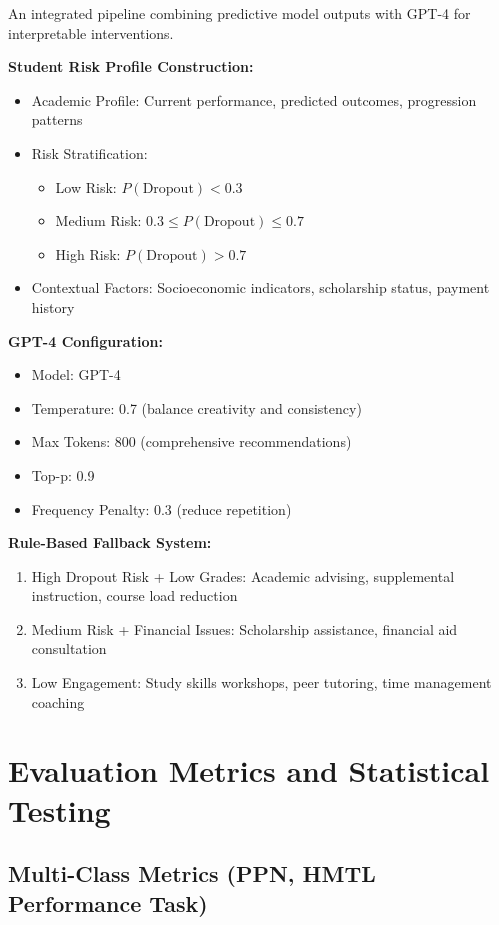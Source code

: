 An integrated pipeline combining predictive model outputs with GPT-4 for interpretable interventions.

\textbf{Student Risk Profile Construction:}
\begin{itemize}
\item Academic Profile: Current performance, predicted outcomes, progression patterns
\item Risk Stratification:
\begin{itemize}
\item Low Risk: $P(\text{Dropout}) < 0.3$
\item Medium Risk: $0.3 \leq P(\text{Dropout}) \leq 0.7$
\item High Risk: $P(\text{Dropout}) > 0.7$
\end{itemize}
\item Contextual Factors: Socioeconomic indicators, scholarship status, payment history
\end{itemize}

\textbf{GPT-4 Configuration:}
\begin{itemize}
\item Model: GPT-4
\item Temperature: 0.7 (balance creativity and consistency)
\item Max Tokens: 800 (comprehensive recommendations)
\item Top-p: 0.9
\item Frequency Penalty: 0.3 (reduce repetition)
\end{itemize}

\textbf{Rule-Based Fallback System:}
\begin{enumerate}
\item High Dropout Risk + Low Grades: Academic advising, supplemental instruction, course load reduction
\item Medium Risk + Financial Issues: Scholarship assistance, financial aid consultation
\item Low Engagement: Study skills workshops, peer tutoring, time management coaching
\end{enumerate}

\section{Evaluation Metrics and Statistical Testing}

\subsection{Multi-Class Metrics (PPN, HMTL Performance Task)}

